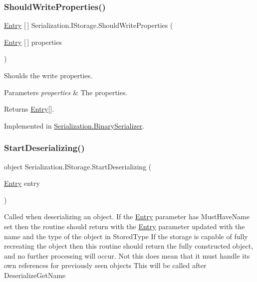\subsubsection{\texorpdfstring{Should\+Write\+Properties()}{ShouldWriteProperties()}}
{\footnotesize\ttfamily \hyperlink{class_serialization_1_1_entry}{Entry} \mbox{[}$\,$\mbox{]} Serialization.\+I\+Storage.\+Should\+Write\+Properties (\begin{DoxyParamCaption}\item[{\hyperlink{class_serialization_1_1_entry}{Entry} \mbox{[}$\,$\mbox{]}}]{properties }\end{DoxyParamCaption})}



Shoulds the write properties. 


\begin{DoxyParams}{Parameters}
{\em properties} & The properties.\\
\hline
\end{DoxyParams}
\begin{DoxyReturn}{Returns}
\hyperlink{class_serialization_1_1_entry}{Entry}\mbox{[}\mbox{]}.
\end{DoxyReturn}


Implemented in \hyperlink{class_serialization_1_1_binary_serializer_adb05a4a6e028617fe748ae28dc97d7c7}{Serialization.\+Binary\+Serializer}.

\mbox{\label{interface_serialization_1_1_i_storage_a90aa19f79a51acf057f20da842ef09b3}} 
\subsubsection{\texorpdfstring{Start\+Deserializing()}{StartDeserializing()}\hspace{0.1cm}{\footnotesize\ttfamily [1/2]}}
{\footnotesize\ttfamily object Serialization.\+I\+Storage.\+Start\+Deserializing (\begin{DoxyParamCaption}\item[{\hyperlink{class_serialization_1_1_entry}{Entry}}]{entry }\end{DoxyParamCaption})}



Called when deserializing an object. If the \hyperlink{class_serialization_1_1_entry}{Entry} parameter has Must\+Have\+Name set then the routine should return with the \hyperlink{class_serialization_1_1_entry}{Entry} parameter updated with the name and the type of the object in Stored\+Type If the storage is capable of fully recreating the object then this routine should return the fully constructed object, and no further processing will occur. Not this does mean that it must handle its own references for previously seen objects This will be called after Deserialize\+Get\+Name 

